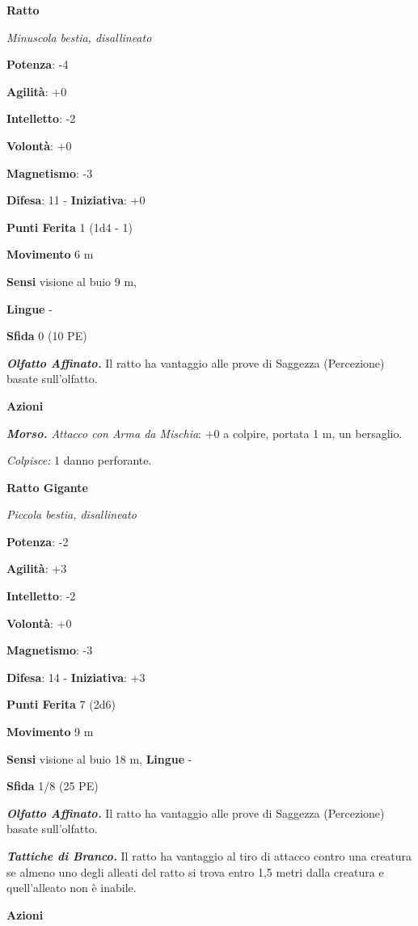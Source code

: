 \begin{multicols}{2}
\textbf{Ratto}

\emph{Minuscola bestia, disallineato}

\textbf{Potenza}: -4

\textbf{Agilità}: +0

\textbf{Intelletto}: -2

\textbf{Volontà}: +0

\textbf{Magnetismo}: -3

\textbf{Difesa}: 11 - \textbf{Iniziativa}: +0

\textbf{Punti Ferita} 1 (1d4 - 1)

\textbf{Movimento} 6 m

\textbf{Sensi} visione al buio 9 m, 

\textbf{Lingue} -

\textbf{Sfida} 0 (10 PE)\smallskip

\emph{\textbf{Olfatto Affinato.}} Il ratto ha vantaggio alle prove di
Saggezza (Percezione) basate sull'olfatto.

\smallskip\textbf{Azioni}

\emph{\textbf{Morso.} Attacco con Arma da Mischia}: +0 a colpire,
portata 1 m, un bersaglio.

\emph{Colpisce:} 1 danno perforante.

\textbf{Ratto Gigante}

\emph{Piccola bestia, disallineato}

\textbf{Potenza}: -2

\textbf{Agilità}: +3

\textbf{Intelletto}: -2

\textbf{Volontà}: +0

\textbf{Magnetismo}: -3

\textbf{Difesa}: 14 - \textbf{Iniziativa}: +3

\textbf{Punti Ferita} 7 (2d6)

\textbf{Movimento} 9 m

\textbf{Sensi} visione al buio 18 m, 
\textbf{Lingue} -

\textbf{Sfida} 1/8 (25 PE)\smallskip

\emph{\textbf{Olfatto Affinato.}} Il ratto ha vantaggio alle prove di
Saggezza (Percezione) basate sull'olfatto.

\emph{\textbf{Tattiche di Branco.}} Il ratto ha vantaggio al tiro di
attacco contro una creatura se almeno uno degli alleati del ratto si
trova entro 1,5 metri dalla creatura e quell'alleato non è inabile.

\smallskip\textbf{Azioni}


\end{multicols}
